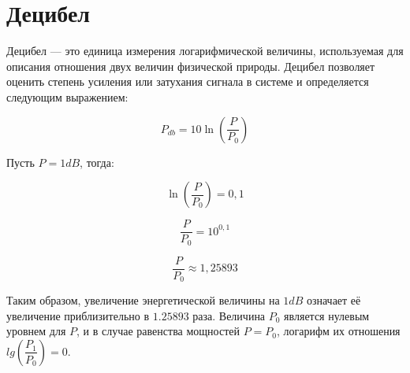 
\section{Децибел}
Децибел --- это единица измерения логарифмической величины, используемая для описания отношения двух величин физической природы. Децибел позволяет оценить степень усиления или затухания сигнала в системе и определяется следующим выражением:

\[ P_{db}=10\ln{(\dfrac{P}{P_{0}})} \]

Пусть $ P = 1 dB $, тогда:

\[\ln({\dfrac{P}{P_{0}}}) = 0,1\]

\[\dfrac{P}{P_{0}} = 10^{0,1}\]

\[\dfrac{P}{P_{0}} \approx 1,25893\]

Таким образом, увеличение энергетической величины на $ 1 dB $ означает её увеличение приблизительно в $ 1.25893 $ раза.
Величина $P_{0}$ является нулевым уровнем для $P$, и в случае равенства мощностей $P = P_{0}$, логарифм их отношения $lg(\dfrac{P_{1}}{P_{0}}) = 0$.

